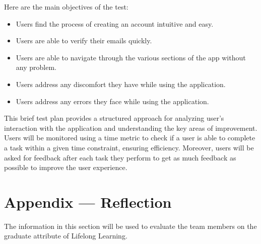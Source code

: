 \documentclass[12pt, titlepage]{article}
\begin{document}
Here are the main objectives of the test: 
\begin{itemize}
    \item Users find the process of creating an account intuitive and easy.
    \item Users are able to verify their emails quickly.
    \item Users are able to navigate through the various sections of the app without any problem.
    \item Users address any discomfort they have while using the application.  
    \item Users address any errors they face while using the application.
\end{itemize}

This brief test plan provides a structured approach for analyzing user's interaction with the application and understanding the key areas of improvement. Users will be monitored using a time metric to check if a user is able to complete a task within a given time constraint, ensuring efficiency. Moreover, users will be asked for feedback after each task they perform to get as much feedback as possible to improve the user experience.  

\newpage{}
\section*{Appendix --- Reflection}


The information in this section will be used to evaluate the team members on the
graduate attribute of Lifelong Learning.


\end{document}
